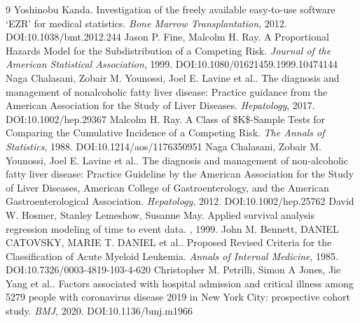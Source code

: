 \documentclass[11pt]{article}
\begin{document}
\begin{thebibliography}{9}
 Yoshinobu Kanda. Investigation of the freely available easy-to-use software ‘EZR’ for medical statistics. \emph{Bone Marrow Transplantation}, 2012. DOI:10.1038/bmt.2012.244
 Jason P. Fine, Malcolm H. Ray. A Proportional Hazards Model for the Subdistribution of a Competing Risk. \emph{Journal of the American Statistical Association}, 1999. DOI:10.1080/01621459.1999.10474144
 Naga Chalasani, Zobair M. Younossi, Joel E. Lavine et al.. The diagnosis and management of nonalcoholic fatty liver disease: Practice guidance from the American Association for the Study of Liver Diseases. \emph{Hepatology}, 2017. DOI:10.1002/hep.29367
 Malcolm H. Ray. A Class of \$K\$-Sample Tests for Comparing the Cumulative Incidence of a Competing Risk. \emph{The Annals of Statistics}, 1988. DOI:10.1214/aos/1176350951
 Naga Chalasani, Zobair M. Younossi, Joel E. Lavine et al.. The diagnosis and management of non-alcoholic fatty liver disease: Practice Guideline by the American Association for the Study of Liver Diseases, American College of Gastroenterology, and the American Gastroenterological Association. \emph{Hepatology}, 2012. DOI:10.1002/hep.25762
 David W. Hosmer, Stanley Lemeshow, Susanne May. Applied survival analysis regression modeling of time to event data. \emph{}, 1999. 
 John M. Bennett, DANIEL CATOVSKY, MARIE T. DANIEL et al.. Proposed Revised Criteria for the Classification of Acute Myeloid Leukemia. \emph{Annals of Internal Medicine}, 1985. DOI:10.7326/0003-4819-103-4-620
 Christopher M. Petrilli, Simon A Jones, Jie Yang et al.. Factors associated with hospital admission and critical illness among 5279 people with coronavirus disease 2019 in New York City: prospective cohort study. \emph{BMJ}, 2020. DOI:10.1136/bmj.m1966
\end{thebibliography}
\end{document}

